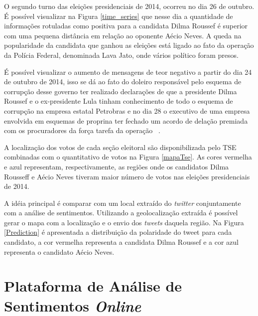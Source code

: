  
 
 O segundo turno das eleições presidenciais de 2014, ocorreu no dia 26 de outubro. É possível visualizar na Figura \ref{time_series} que nesse dia
 a quantidade de informações rotuladas como positiva para a candidata Dilma Roussef é superior com uma pequena distância em relação ao oponente Aécio
 Neves. A queda na popularidade da candidata que ganhou as eleições está ligado ao fato da operação da Polícia Federal, denominada Lava Jato, onde
 vários político foram presos. 
 
 É possível visualizar o aumento de mensagens de teor negativo a partir do dia 24 de outubro de 2014, isso se dá ao fato do doleiro 
 responsável pelo esquema de corrupção desse governo ter realizado declarações de que a presidente Dilma Roussef e o ex-presidente Lula tinham 
 conhecimento de todo o esquema de corrupção na empresa estatal Petrobras e no dia 28 o executivo de uma empresa envolvida em esquemas de proprina
 ter fechado um acordo de delação premiada com os procuradores da força tarefa da operação ~\cite{LavaJato}. 
 
 
 A localização dos votos de cada seção eleitoral são disponibilizada pelo \acrshort{TSE}
 combinadas com o quantitativo de votos na Figura \ref{mapaTse}. As cores
 vermelha e azul representam, respectivamente, as regiões onde
 os candidatos Dilma Rousseff e Aécio Neves tiveram maior número de votos nas eleições presidenciais de 2014.
 
 
 
 A idéia principal é comparar com um local extraído do \textit{twitter}
 conjuntamente com a análise de sentimentos.
 Utilizando a geolocalização extraída é possível gerar o mapa
 com a localização e o envio dos \textit{tweets} daquela região. Na
 Figura \ref{Prediction} é apresentada a distribuição da polaridade do tweet
 para cada candidato, a cor vermelha representa a candidata Dilma Roussef 
 e a cor azul representa o candidato Aécio Neves.
 
 
 
 
 
 \section{Plataforma de Análise de Sentimentos \textit{Online}}
 

